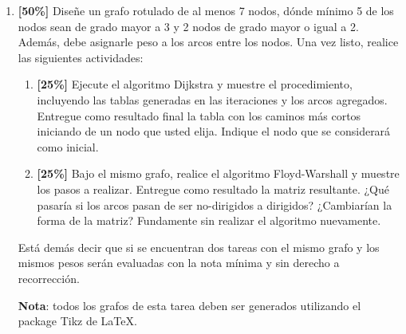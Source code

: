 \documentclass[letterpaper,10pt]{article}
\begin{document}
\begin{enumerate}
a)\textbf{[20\%]} Desencripte la función Hash para hallar la energía que consume cada actividad y, utilizando el package Tikz de \LaTeX, construya un grafo con las descripciones de la tabla.\\
b)\textbf{[15\%]} Determine el valor mínimo de $\mu $ de manera que la actividad J pertenezca a la ruta crítica de consumo de energía. La ruta crítica debe ser única. Justifique su respuesta y muestre dicha ruta junto con el consumo óptimo total de energía.\\
c)\textbf{[15\%]} Indique, si es que es posible, en qué rango de valores se encontraría $\mu $ si para establecer la conexión completa de la red neuronal, se necesita consumir a lo más un 300\% de energía de la fuente de control, y se necesita al menos una holgura de un 20\%  para desarrollar la actividad D. En el caso de que no sea posible, fundamente el porqué.\\

\item \textbf{[50\%]} Diseñe un grafo rotulado de al menos 7 nodos, dónde mínimo 5 de los nodos sean de grado mayor a 3 y 2 nodos de grado mayor o igual a 2. Además, debe asignarle peso a los arcos entre los nodos. Una vez listo, realice las siguientes actividades:

\begin{enumerate}
    \item \textbf{[25\%]} Ejecute el algoritmo Dijkstra y muestre el procedimiento, incluyendo las tablas generadas en las iteraciones y los arcos agregados. Entregue como resultado final la tabla con los caminos más cortos iniciando de un nodo que usted elija. Indique el nodo que se considerará como inicial.
    \item \textbf{[25\%]} Bajo el mismo grafo, realice el algoritmo Floyd-Warshall y muestre los pasos a realizar. Entregue como resultado la matriz resultante. ¿Qué pasaría si los arcos pasan de ser no-dirigidos a dirigidos? ¿Cambiarían la forma de la matriz? Fundamente sin realizar el algoritmo nuevamente.
\end{enumerate}

Está demás decir que si se encuentran dos tareas con el mismo grafo y los mismos pesos serán evaluadas con la nota mínima y sin derecho a recorrección.

\textbf{Nota}: todos los grafos de esta tarea deben ser generados utilizando el package Tikz de \LaTeX.

\end{enumerate}
\end{document}

